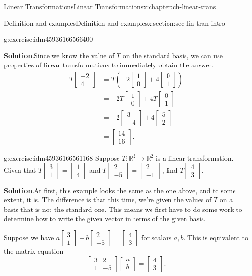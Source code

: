 \documentclass[oneside,10pt,]{book}
\newcommand{\blocktitlefont}{\relax}
\numberwithin{equation}{section}
\newcommand{\bbm}{\begin{bmatrix}}
\newcommand{\ebm}{\end{bmatrix}}
\newcommand{\R}{\mathbb{R}}
\newcommand{\amp}{&}
\begin{document}
\begin{chapterptx}{Linear Transformations}{}{Linear Transformations}{}{}{x:chapter:ch-linear-trans}
\begin{sectionptx}{Definition and examples}{}{Definition and examples}{}{}{x:section:sec-lin-tran-intro}
\begin{inlineexercise}{}{g:exercise:idm45936166566400}
\par\smallskip%
\noindent\textbf{\blocktitlefont Solution}.\label{g:solution:idm45936166563824}{}\hypertarget{g:solution:idm45936166563824}{}\quad{}Since we know the value of \(T\) on the standard basis, we can use properties of linear transformations to immediately obtain the answer:%
\begin{align*}
T\bbm -2\\4\ebm \amp= T\left(-2\bbm 1\\0\ebm +4\bbm 0\\1\ebm\right)\\
\amp = -2T\bbm1\\0\ebm+4T\bbm 0\\1\ebm\\
\amp = -2\bbm 3\\-4\ebm +4\bbm 5\\2\ebm\\
\amp = \bbm 14\\16\ebm\text{.}
\end{align*}
%
\end{inlineexercise}%
\begin{inlineexercise}{}{g:exercise:idm45936166561168}%
Suppose \(T:\R^2\to \R^2\) is a linear transformation. Given that \(T\bbm 3\\1\ebm = \bbm 1\\4\ebm\) and \(T\bbm 2\\-5\ebm = \bbm 2\\-1\ebm\), find \(T\bbm 4\\3\ebm\).%
\par\smallskip%
\noindent\textbf{\blocktitlefont Solution}.\label{g:solution:idm45936166558800}{}\hypertarget{g:solution:idm45936166558800}{}\quad{}At first, this example looks the same as the one above, and to some extent, it is. The difference is that this time, we're given the values of \(T\) on a basis that is not the standard one. This means we first have to do some work to determine how to write the given vector in terms of the given basis.%
\par
Suppose we have \(a\bbm 3\\1\ebm+b\bbm 2\\-5\ebm = \bbm 4\\3\ebm\) for scalars \(a,b\). This is equivalent to the matrix equation%
\begin{equation*}
\bbm 3\amp 2\\1\amp -5\ebm\bbm a\\b\ebm = \bbm 4\\3\ebm.

\end{equation*}
\end{inlineexercise}
\end{sectionptx}
\end{chapterptx}
\end{document}
